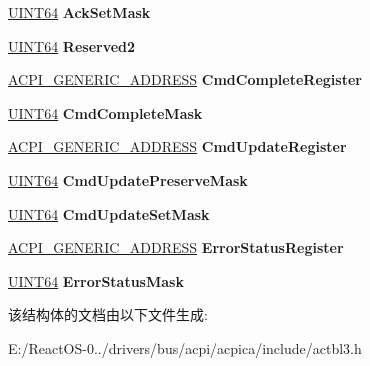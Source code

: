 \begin{DoxyCompactItemize}
\mbox{\label{structacpi__pcct__ext__pcc__master_abbd89f68cb77e7e874b472a95897c040}} 
\hyperlink{_processor_bind_8h_a57be03562867144161c1bfee95ca8f7c}{U\+I\+N\+T64} {\bfseries Ack\+Set\+Mask}
\item 
\mbox{\label{structacpi__pcct__ext__pcc__master_a3c8bb7a1f000bd3f20b37df4f3868f00}} 
\hyperlink{_processor_bind_8h_a57be03562867144161c1bfee95ca8f7c}{U\+I\+N\+T64} {\bfseries Reserved2}
\item 
\mbox{\label{structacpi__pcct__ext__pcc__master_a9e26197abcc33964e279811a92a4c159}} 
\hyperlink{structacpi__generic__address}{A\+C\+P\+I\+\_\+\+G\+E\+N\+E\+R\+I\+C\+\_\+\+A\+D\+D\+R\+E\+SS} {\bfseries Cmd\+Complete\+Register}
\item 
\mbox{\label{structacpi__pcct__ext__pcc__master_a2037cbd9581236a8cf4fde5de306cdc1}} 
\hyperlink{_processor_bind_8h_a57be03562867144161c1bfee95ca8f7c}{U\+I\+N\+T64} {\bfseries Cmd\+Complete\+Mask}
\item 
\mbox{\label{structacpi__pcct__ext__pcc__master_a4d13a8bf38436b02250d2885ec164422}} 
\hyperlink{structacpi__generic__address}{A\+C\+P\+I\+\_\+\+G\+E\+N\+E\+R\+I\+C\+\_\+\+A\+D\+D\+R\+E\+SS} {\bfseries Cmd\+Update\+Register}
\item 
\mbox{\label{structacpi__pcct__ext__pcc__master_a9ab6505bc9bb2c93a67ef14090465e60}} 
\hyperlink{_processor_bind_8h_a57be03562867144161c1bfee95ca8f7c}{U\+I\+N\+T64} {\bfseries Cmd\+Update\+Preserve\+Mask}
\item 
\mbox{\label{structacpi__pcct__ext__pcc__master_ad8b9c9edb6954e2060082455de1ae6a2}} 
\hyperlink{_processor_bind_8h_a57be03562867144161c1bfee95ca8f7c}{U\+I\+N\+T64} {\bfseries Cmd\+Update\+Set\+Mask}
\item 
\mbox{\label{structacpi__pcct__ext__pcc__master_ab7839078031da161de45ffc32eed5af9}} 
\hyperlink{structacpi__generic__address}{A\+C\+P\+I\+\_\+\+G\+E\+N\+E\+R\+I\+C\+\_\+\+A\+D\+D\+R\+E\+SS} {\bfseries Error\+Status\+Register}
\item 
\mbox{\label{structacpi__pcct__ext__pcc__master_a799067b796d2d8fad7bd9b72b16e7eda}} 
\hyperlink{_processor_bind_8h_a57be03562867144161c1bfee95ca8f7c}{U\+I\+N\+T64} {\bfseries Error\+Status\+Mask}
\end{DoxyCompactItemize}


该结构体的文档由以下文件生成\+:\begin{DoxyCompactItemize}
\item 
E\+:/\+React\+O\+S-\/0../drivers/bus/acpi/acpica/include/actbl3.\+h\end{DoxyCompactItemize}
